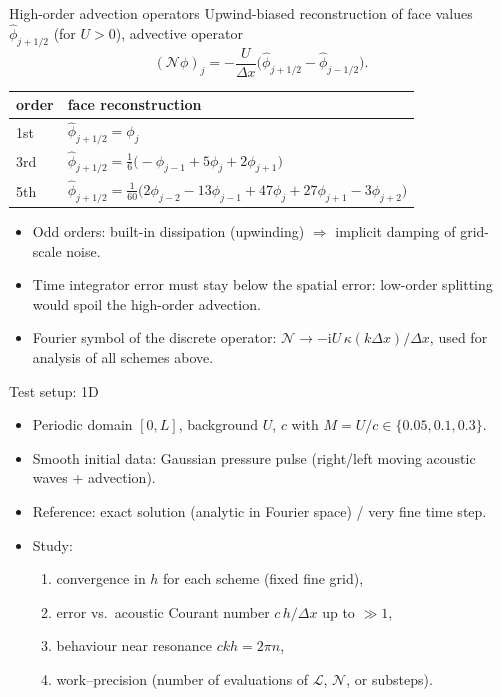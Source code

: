 \documentclass[aspectratio=169,10pt]{beamer}
\newcommand{\ii}{\mathrm{i}}
\newcommand{\LL}{\mathcal{L}}   %
\newcommand{\NN}{\mathcal{N}}   %
\begin{document}
\begin{frame}{High-order advection operators}
  Upwind-biased reconstruction of face values $\hat\phi_{j+1/2}$ (for $U>0$), advective operator
  \[
    (\NN\phi)_j=-\frac{U}{\Delta x}\big(\hat\phi_{j+1/2}-\hat\phi_{j-1/2}\big).
  \]
  \begin{center}
  \begin{tabular}{ll}
    \toprule
    order & face reconstruction \\
    \midrule
    1st & $\hat\phi_{j+1/2}=\phi_j$\\
    3rd & $\hat\phi_{j+1/2}=\tfrac16\big(-\phi_{j-1}+5\phi_j+2\phi_{j+1}\big)$\\
    5th & $\hat\phi_{j+1/2}=\tfrac1{60}\big(2\phi_{j-2}-13\phi_{j-1}+47\phi_j+27\phi_{j+1}-3\phi_{j+2}\big)$\\
    \bottomrule
  \end{tabular}
  \end{center}
  \begin{itemize}
    \item Odd orders: built-in dissipation (upwinding) $\Rightarrow$ implicit damping of grid-scale noise.
    \item Time integrator error must stay below the spatial error: low-order splitting would spoil the high-order advection.
    \item Fourier symbol of the discrete operator: $\NN\to-\ii U\,\kappa(k\Delta x)/\Delta x$, used for analysis of all schemes above.
  \end{itemize}
\end{frame}

\begin{frame}{Test setup: 1D}
  \begin{itemize}
    \item Periodic domain $[0,L]$, background $U$, $c$ with $M=U/c\in\{0.05,0.1,0.3\}$.
    \item Smooth initial data: Gaussian pressure pulse (right/left moving acoustic waves + advection).
    \item Reference: exact solution (analytic in Fourier space) / very fine time step.
    \item Study:
    \begin{enumerate}
      \item convergence in $h$ for each scheme (fixed fine grid),
      \item error vs.\ acoustic Courant number $c\,h/\Delta x$ up to $\gg1$,
      \item behaviour near resonance $ckh=2\pi n$,
      \item work--precision (number of evaluations of $\LL$, $\NN$, or substeps).
    \end{enumerate}
  \end{itemize}
\end{frame}
\end{document}
